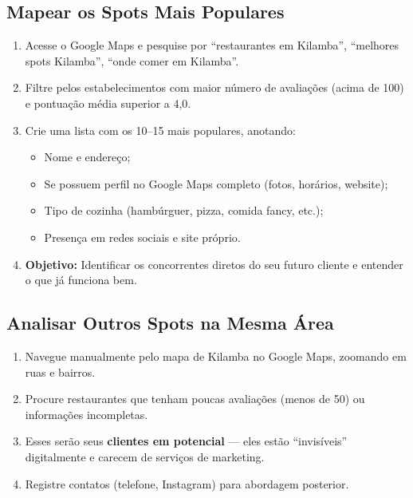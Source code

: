 \documentclass[a4paper,12pt]{article}
\begin{document}
\subsection{Mapear os Spots Mais Populares}
\begin{enumerate}
    \item Acesse o Google Maps e pesquise por “restaurantes em Kilamba”, “melhores spots Kilamba”, “onde comer em Kilamba”.
    \item Filtre pelos estabelecimentos com maior número de avaliações (acima de 100) e pontuação média superior a 4,0.
    \item Crie uma lista com os 10–15 mais populares, anotando:
    \begin{itemize}
        \item Nome e endereço;
        \item Se possuem perfil no Google Maps completo (fotos, horários, website);
        \item Tipo de cozinha (hambúrguer, pizza, comida fancy, etc.);
        \item Presença em redes sociais e site próprio.
    \end{itemize}
    \item \textbf{Objetivo:} Identificar os concorrentes diretos do seu futuro cliente e entender o que já funciona bem.
\end{enumerate}

\subsection{Analisar Outros Spots na Mesma Área}
\begin{enumerate}
    \item Navegue manualmente pelo mapa de Kilamba no Google Maps, zoomando em ruas e bairros.
    \item Procure restaurantes que tenham poucas avaliações (menos de 50) ou informações incompletas.
    \item Esses serão seus \textbf{clientes em potencial} — eles estão “invisíveis” digitalmente e carecem de serviços de marketing.
    \item Registre contatos (telefone, Instagram) para abordagem posterior.
\end{enumerate}
\end{document}
